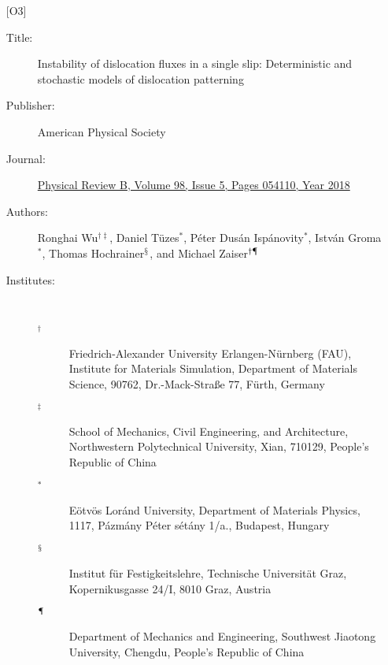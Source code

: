 \begin{itemize}
\item [{[O3]}] \label{paper:A4}
\begin{description}
\item [Title:] Instability of dislocation fluxes in a single slip: Deterministic and stochastic models of dislocation patterning
\item [Publisher:] American Physical Society
\item [Journal:] \href{https://doi.org/10.1103/PhysRevB.98.054110}{Physical Review B, Volume 98, Issue 5, Pages 054110, Year 2018}
\item [Authors:] Ronghai Wu$^{\dagger \ddagger}$, Daniel Tüzes$^*$, Péter Dusán Ispánovity$^*$, István Groma$^*$, Thomas Hochrainer$^\mathsection$, and Michael Zaiser$^{\dagger \mathparagraph}$
\item [Institutes:]~
\begin{description}
\item [$^\dagger$] Friedrich-Alexander University Erlangen-Nürnberg (FAU), Institute for Materials Simulation, Department of Materials Science, 90762, Dr.-Mack-Straße 77, Fürth, Germany
\item [$^\ddagger$] School of Mechanics, Civil Engineering, and Architecture, Northwestern Polytechnical University, Xian, 710129, People’s Republic of China
\item [$^*$] Eötvös Loránd University, Department of Materials Physics, 1117, Pázmány Péter sétány 1/a., Budapest, Hungary
\item [$^\mathsection$] Institut für Festigkeitslehre, Technische Universität Graz, Kopernikusgasse 24/I, 8010 Graz, Austria
\item [$^\mathparagraph$] Department of Mechanics and Engineering, Southwest Jiaotong University, Chengdu, People’s Republic of China
\end{description}
\end{description}

\pagebreak


\end{itemize}
